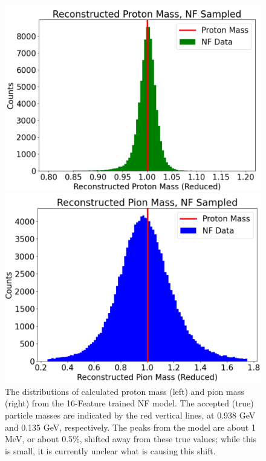 \begin{figure}[htb]
    \centering
     \begin{minipage}{0.2349\textwidth}
        \centering
        \includegraphics[width=.97\textwidth,trim={ 0 0 0 0},clip]{Chapters/Ch3-Simulations/normalizing_flows/pics/FinalPictures/updated_proton_reduced.png}

    \end{minipage}
    \begin{minipage}{0.21245\textwidth}
        \centering
        
        \includegraphics[width=.97\textwidth,trim={ 0 0 0 0},clip]{Chapters/Ch3-Simulations/normalizing_flows/pics/FinalPictures/updated_pion_reduced.png}
    \end{minipage}
        \caption[Placeholder Short text]{The distributions of calculated proton mass (left) and pion mass (right) from the 16-Feature trained NF model.  The accepted (true) particle masses are indicated by the red vertical lines, at 0.938 GeV and 0.135 GeV, respectively.
        The peaks from the model are about 1 MeV, or about 0.5\%, shifted away from these true values; while this is small, it is currently unclear what is causing this shift.}
    \label{fig:protonspions}
\end{figure}


